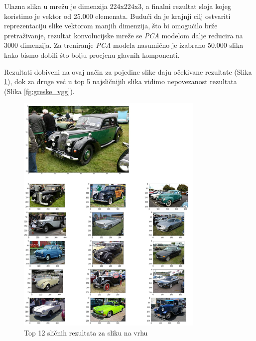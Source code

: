\documentclass[times, utf8, proizvoljni, numeric]{fer}
\begin{document}
Ulazna slika u mrežu je dimenzija 224x224x3, a finalni rezultat sloja kojeg koristimo je vektor od 25.000 elemenata. Budući da je krajnji cilj ostvariti reprezentaciju slike vektorom manjih dimenzija, što bi omogućilo brže pretraživanje, rezultat konvolucijske mreže se \textit{PCA} modelom dalje reducira na 3000 dimenzija. Za treniranje \textit{PCA} modela nasumično je izabrano 50.000 slika kako bismo dobili što bolju procjenu glavnih komponenti.

Rezultati dobiveni na ovaj način za pojedine slike daju očekivane rezultate  (Slika \ref{fg:auti_vgg}), dok za druge već u top 5 najsličnijih slika vidimo nepovezanost rezultata (Slika \ref{fg:greske_vgg}). 

\begin{figure}[!ht]
	\begin{center}
		\captionsetup{justification=centering}
		\includegraphics[width=0.8\textwidth]{./imgs/auti_vgg.png}
		\caption{Top 12 sličnih rezultata za sliku na vrhu}
		\label{fg:auti_vgg}
	\end{center}
\end{figure}
\end{document}
